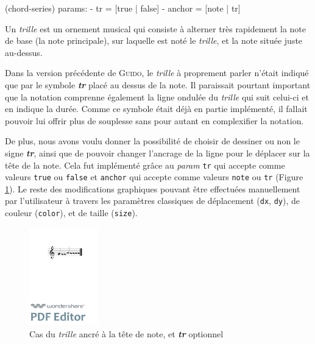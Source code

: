 \documentclass{article}
\newenvironment{gmncode}	{\vspace{-2mm}\small\verbatim}{\endverbatim\vspace{-2mm}}
\newcommand{\guido}			{\textsc{Guido}}
\newcommand{\code}[1]		{{\small \texttt{#1}}}
\begin{document}
\begin{gmncode}
  (chord-series)
   params:
    - tr = [true | false]
    - anchor = [note | tr]
\end{gmncode}

Un \emph{trille} est \og{}un ornement musical qui consiste à alterner très rapidement la note de base (la note principale), sur laquelle est noté le \emph{trille}, et la note située juste au-dessus\fg{}.

Dans la version précédente de \guido, le \emph{trille} à proprement parler n'était indiqué que par le symbole \textit{\textbf{tr}} placé au dessus de la note. Il paraissait pourtant important que la notation comprenne également la ligne ondulée du \emph{trille} qui suit celui-ci et en indique la durée. Comme ce symbole était déjà en partie implémenté, il fallait pouvoir lui offrir plus de souplesse sans pour autant en complexifier la notation.


De plus, nous avons voulu donner la possibilité de choisir de dessiner ou non le signe \textit{\textbf{tr}}, ainsi que de pouvoir changer l'ancrage de la ligne pour le déplacer sur la tête de la note. Cela fut implémenté grâce au \emph{param} \code{tr} qui accepte comme valeurs \code{true} ou \code{false} et \code{anchor} qui accepte comme valeurs \code{note} ou \code{tr} (Figure \ref{fig:trillanchor}). Le reste des modifications graphiques pouvant être effectuées manuellement par l'utilisateur à travers les paramètres classiques de déplacement (\code{dx}, \code{dy}), de couleur (\code{color}), et de taille (\code{size}).

\begin{figure}[h]
\centering
\begin{gmncode}
[ \trill<tr="false", anchor="note">
( {g} {a/2} ) ]
\end{gmncode}
\includegraphics[width=30mm]{img/trillanchor.pdf}
\caption{Cas du \emph{trille} ancré à la tête de note, et \textit{\textbf{tr}} optionnel}
\label{fig:trillanchor}
\end{figure}
\end{document}
